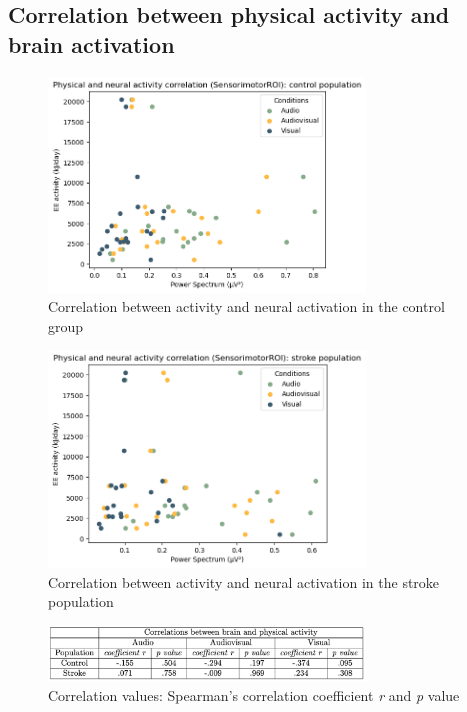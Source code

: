 \subsection*{Correlation between physical activity and brain activation}
\begin{figure}[H]
    \centering
    \includegraphics[width=0.75\textwidth]{scatter_plots/h_sensorimotor_activeq.png}
    \caption{Correlation between activity and neural activation in the control group}
    \label{fig: correlation activeq control} 
\end{figure}
\begin{figure}[H]
    \centering
    \includegraphics[width=0.75\textwidth]{scatter_plots/s_sensorimotor_activeq.png}
    \caption{Correlation between activity and neural activation in the stroke population}
    \label{fig: correlation activeq stroke} 
\end{figure}
\begin{figure}[H]
    \centering
    \includegraphics[width=0.75\textwidth]{significance_tables/correlation_activeq_.png}
    \caption{Correlation values: Spearman's correlation coefficient \textit{r} and \textit{p} value}
    \label{fig: significance correlation activeq} 
\end{figure}